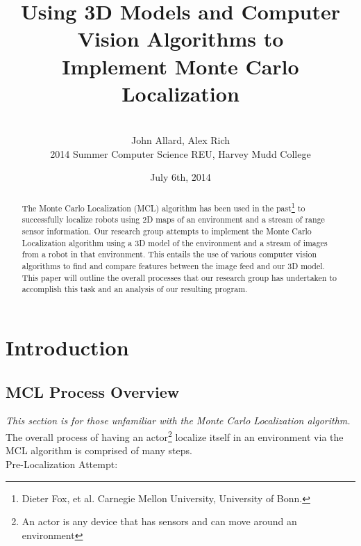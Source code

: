 \documentclass[a4paper,11pt]{article}
\title{Using 3D Models and Computer Vision Algorithms to \\ Implement Monte Carlo Localization}
\author{ \\[7in]  John Allard, Alex Rich \\ 2014 Summer Computer Science REU, Harvey Mudd College}
\date{July 6th, 2014 \\}
\begin{document}
  \maketitle   
  \newpage  
  
  \tableofcontents
  
  \newpage
 
  \begin{abstract}  
  The Monte Carlo Localization (MCL) algorithm has been used in the past\footnote{ Dieter Fox, et al. Carnegie Mellon University, University of Bonn.} to successfully localize robots using 2D maps of an environment and a stream of range sensor information. Our research group attempts to implement the Monte Carlo Localization algorithm using a 3D model of the environment and a stream of images from a robot in that environment. This entails the use of various computer vision algorithms to find and compare features between the image feed and our 3D model. This paper will outline the overall processes that our research group has undertaken to accomplish this task and an analysis of our resulting program. 
  \end{abstract}
  
  \section{Introduction} 
  
  \subsection{MCL Process Overview}
  \emph{This section is for those unfamiliar with the Monte Carlo Localization algorithm.}\\ The overall process of having an actor\footnote{An actor is any device that has sensors and can move around an environment} localize itself in an environment via the MCL algorithm is comprised of many steps.\\
  
  Pre-Localization Attempt:
  
\end{document}
